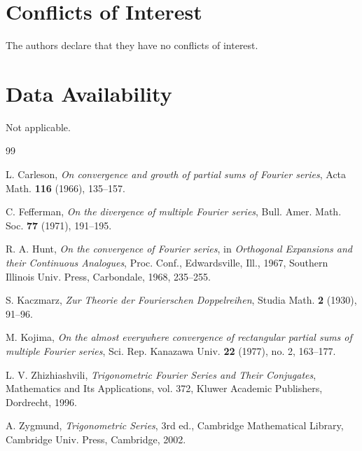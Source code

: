 \documentclass[11pt,reqno]{amsart}
\numberwithin{equation}{section}
\theoremstyle{plain}
\theoremstyle{definition}
\theoremstyle{remark}
\begin{document}
\section*{Conflicts of Interest}

The authors declare that they have no conflicts of interest.

\section*{Data Availability}

Not applicable.

\begin{thebibliography}{99}

L. Carleson, \emph{On convergence and growth of partial sums of Fourier series}, Acta Math. \textbf{116} (1966), 135--157.

C. Fefferman, \emph{On the divergence of multiple Fourier series}, Bull. Amer. Math. Soc. \textbf{77} (1971), 191--195.

R. A. Hunt, \emph{On the convergence of Fourier series}, in \emph{Orthogonal Expansions and their Continuous Analogues}, Proc. Conf., Edwardsville, Ill., 1967, Southern Illinois Univ. Press, Carbondale, 1968, 235--255.

S. Kaczmarz, \emph{Zur Theorie der Fourierschen Doppelreihen}, Studia Math. \textbf{2} (1930), 91--96.

M. Kojima, \emph{On the almost everywhere convergence of rectangular partial sums of multiple Fourier series}, Sci. Rep. Kanazawa Univ. \textbf{22} (1977), no. 2, 163--177.

L. V. Zhizhiashvili, \emph{Trigonometric Fourier Series and Their Conjugates}, Mathematics and Its Applications, vol. 372, Kluwer Academic Publishers, Dordrecht, 1996.

A. Zygmund, \emph{Trigonometric Series}, 3rd ed., Cambridge Mathematical Library, Cambridge Univ. Press, Cambridge, 2002.

\end{thebibliography}
\end{document}
